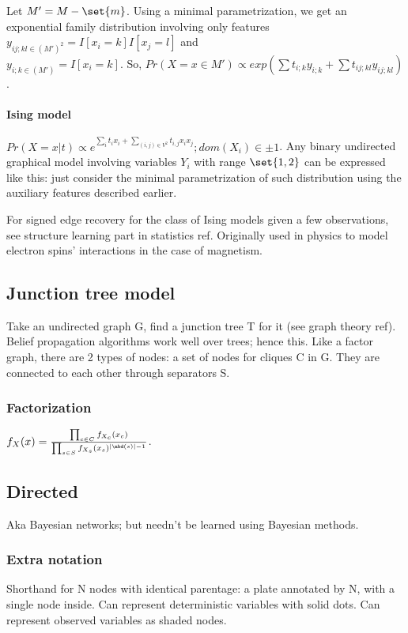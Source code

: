 \documentclass[oneside, article]{memoir}
\begin{document}
Let $M' = M-\set{m}$. Using a minimal parametrization, we get an exponential family distribution involving only features $y_{ij;kl \in (M')^{2}} = I[x_i = k] I[x_j = l]$ and \\$y_{i;k \in (M')} = I[x_i = k]$. So, $Pr(X = x \in M') \propto exp(\sum t_{i;k} y_{i;k} + \sum t_{ij;kl} y_{ij;kl})$.

\paragraph*{Ising model}
$Pr(X = x|t) \propto e^{\sum_i t_i x_i + \sum_{(i, j) \in V^{2}} t_{i,j} x_i x_j}; dom(X_i) \in \pm 1$. Any binary undirected graphical model involving variables $Y_i$ with range $\set{1, 2}$ can be expressed like this: just consider the minimal parametrization of such distribution using the auxiliary features described earlier.

For signed edge recovery for the class of Ising models given a few observations, see structure learning part in statistics ref. Originally used in physics to model electron spins' interactions in the case of magnetism.

\subsection{Junction tree model}
Take an undirected graph G, find a junction tree T for it (see graph theory ref). Belief propagation algorithms work well over trees; hence this. Like a factor graph, there are 2 types of nodes: a set of nodes for cliques C in G. They are connected to each other through separators S.

\subsubsection{Factorization}
$f_X(x) = \frac{\prod_{c \in C}f_{X_c}(x_c)}{\prod_{s \in S} f_{X_s}(x_s)^{|\nbd(s)| -1}}$.

\subsection{Directed}
Aka Bayesian networks; but needn't be learned using Bayesian methods.

\subsubsection{Extra notation}
Shorthand for N nodes with identical parentage: a plate annotated by N, with a single node inside. Can represent deterministic variables with solid dots. Can represent observed variables as shaded nodes.
\end{document}
